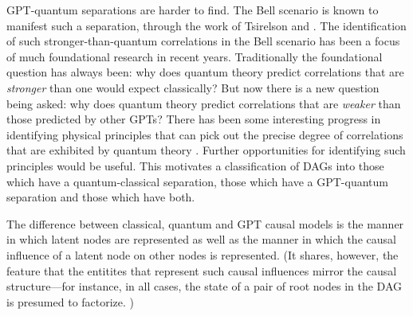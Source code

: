 GPT-quantum separations are harder to find. The Bell scenario is known to manifest such a separation, through the work of Tsirelson \cite{Tsirelson1980} and \citet{PROriginal}.  The identification of such stronger-than-quantum correlations in the Bell scenario has been a focus of much foundational research in recent years.  Traditionally the foundational question has always been: why does quantum theory predict correlations that are {\em stronger} than one would expect classically?  But now there is a new question being asked: why does quantum theory predict correlations that are {\em weaker} than those predicted by other GPTs?  There has been some interesting progress in identifying physical principles that can pick out the precise degree of correlations that are exhibited by quantum theory \cite{PopescuReviewNatureComm,ScaraniML,Rohrlich2014,InfoCausArXiv,LOExploring,EPNBody,barnum2014interference,AlmostQuantum}.  Further opportunities for identifying such principles would be useful.  This motivates a classification of DAGs into those which have a quantum-classical separation, those which have a GPT-quantum separation and those which have both.



The difference between classical, quantum and GPT causal models is the manner in which latent nodes are represented as well as the manner in which the causal influence of a latent node on other nodes is represented.  (It shares, however, the feature that the entitites that represent such causal influences mirror the causal structure---for instance, in all cases, the state of a pair of root nodes in the DAG is presumed to factorize. )

